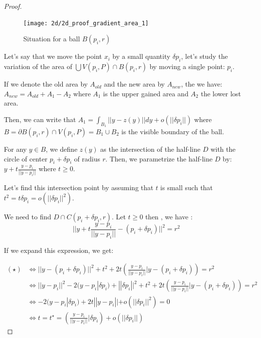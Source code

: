 \begin{proof}

\begin{figure}[H]
    \centering
    \texttt{[image: 2d/2d\_proof\_gradient\_area\_1]}
    \caption{Situation for a ball $ B(p_i, r) $}
\end{figure}

Let's say that we move the point $ x _i $ by a small quantity $ \delta p_i $, let's study the variation
of the area of $ \bigcup V(p_i, P) \cap B(p_i, r) $ by moving a single point: $ p_i $.

If we denote the old area by $ A_{old} $ and the new area by $ A_{new} $, the we
have: $ A_{new} = A_{old} + A_1 - A_2 $ where $ A_1 $ is the upper gained area
and $ A_2 $ the lower lost area.

Then, we can write that $ A_1 = \int_{B_1} || y - z(y) || dy + o(||\delta p_i||) $ where $ B =
\partial B(p_i, r) \cap V(p_i, P) = B_1 \cup B_2 $ is the visible boundary of
the ball.

For any $ y \in B $, we define $ z(y) $ as the intersection of the half-line $ D $
with the circle of center $ p_i + \delta p_i $ of radius $ r $.
Then, we parametrize the half-line $ D $ by: $ y + t \frac{y - p_i}{||y - p_i||}
$ where $ t \ge 0 $.

Let's find this intersection point by assuming that $ t $ is small
such that $ t^2 = t \delta p_i = o(||\delta p_i||^2) $.

We need to find $ D \cap C(p_i + \delta p_i, r) $. Let $ t \ge 0 $ then , we have :
\begin{equation}
    || y + t \frac{y - p_i}{|| y - p_i||} - (p_i + \delta p_i) ||^2 = r^2
    \tag{$\star$}
\end{equation}

If we expand this expression, we get:

\begin{align*}
    (\star) & \iff || y
    - (p_i + \delta p_i) ||^2 + t^2 + 2t \left( \frac{y-p_i}{|| y - p_i||} | y - (p_i
        + \delta p_i) \right) = r^2 \\
    & \iff || y - p_i || ^2 - 2 (y - p_i | \delta p_i) + || \delta p_i || ^2 + t^2 + 2t
    \left( \frac{y-p_i}{|| y - p_i||} | y - (p_i + \delta p_i) \right) = r^2 \\
    & \iff -2 (y - p_i | \delta p_i) + 2t || y - p_i|| + o(||\delta p_i||^2) = 0 \\
    & \iff t = t^{\star} = \left( \frac{y - p_i}{||y - p_i||} | \delta p_i \right) +
    o(||\delta p_i||)
\end{align*}


\end{proof}
